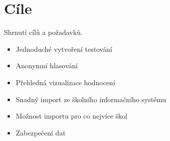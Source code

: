 \section{Cíle}
Shrnutí cílů a požadavků.
\begin{itemize}
    \item Jednoduché vytvoření testování
    \item Anonymní hlasování
    \item Přehledná vizualizace hodnocení
    \item Snadný import ze školního informačního systému
    \item Možnost importu pro co nejvíce škol
    \item Zabezpečení dat
\end{itemize}

